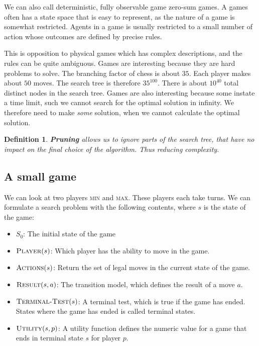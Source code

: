 \documentclass{article}
\newtheorem{definition}{Definition}[section]
\begin{document}
We can also call deterministic, fully observable game zero-sum games. A games
often has a state space that is easy to represent, as the nature of a game is
somewhat restricted. Agents in a game is usually restricted to a small number of
action whose outcomes are defined by precise rules.

This is opposition to physical games which has complex descriptions, and the
rules can be quite ambiguous. Games are interesting because they are hard
problems to solve. The branching factor of chess is about $35$. Each player
makes about $50$ moves. The search tree is therefore $35^{100}$. There is about
$10^{40}$ total distinct nodes in the search tree.  Games are also interesting
because some instate a time limit, such we cannot search for the optimal
solution in infinity. We therefore need to make \emph{some} solution, when we
cannot calculate the optimal solution. 

\begin{definition}
  \textbf{Pruning} allows us to ignore parts of the search tree, that have no
  impact on the final choice of the algorithm. Thus reducing complexity.
\end{definition}

\subsection{A small game}%
\label{sub:a_small_game}

We can look at two players \textsc{min} and \textsc{max}. These players each
take turns. We can formulate a search problem with the following contents, where
$s$ is the state of the game:

\begin{itemize}
  \item $S_0$: The initial state of the game 
  \item $\textsc{Player}(s)$: Which player has the ability to move in the game.
  \item $\textsc{Actions}(s)$: Return the set of legal moves in the current
    state of the game.
  \item $\textsc{Result}(s,a)$: The transition model, which defines the result
    of a move $a$.
  \item $\textsc{Terminal-Test}(s)$: A terminal test, which is true if the game
    has ended. States where the game has ended is called terminal states.
  \item $\textsc{Utility}(s,p)$: A utility function defines the numeric value
   for a game that ends in terminal state $s$ for player $p$.
\end{itemize}
\end{document}
